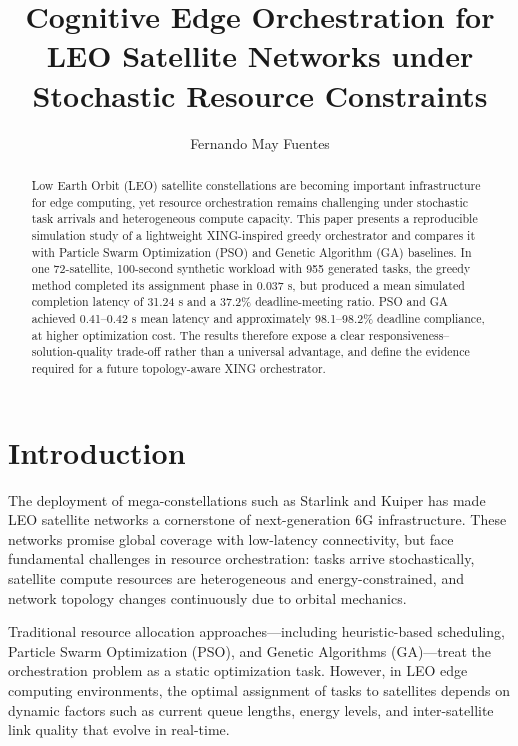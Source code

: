 \documentclass[sigconf]{acmart}
\title{Cognitive Edge Orchestration for LEO Satellite Networks under Stochastic Resource Constraints}
\author{Fernando May Fuentes}
\affiliation{
  \institution{Instituto Polit\'{e}cnico Nacional}
  \city{Ciudad de M\'{e}xico}
  \country{M\'{e}xico}
}
\begin{document}
\begin{abstract}
Low Earth Orbit (LEO) satellite constellations are becoming important infrastructure for edge computing, yet resource orchestration remains challenging under stochastic task arrivals and heterogeneous compute capacity. This paper presents a reproducible simulation study of a lightweight XING-inspired greedy orchestrator and compares it with Particle Swarm Optimization (PSO) and Genetic Algorithm (GA) baselines. In one 72-satellite, 100-second synthetic workload with 955 generated tasks, the greedy method completed its assignment phase in 0.037 s, but produced a mean simulated completion latency of 31.24 s and a 37.2\% deadline-meeting ratio. PSO and GA achieved 0.41--0.42 s mean latency and approximately 98.1--98.2\% deadline compliance, at higher optimization cost. The results therefore expose a clear responsiveness--solution-quality trade-off rather than a universal advantage, and define the evidence required for a future topology-aware XING orchestrator.
\end{abstract}


\maketitle

\section{Introduction}

The deployment of mega-constellations such as Starlink and Kuiper has made LEO satellite networks a cornerstone of next-generation 6G infrastructure. These networks promise global coverage with low-latency connectivity, but face fundamental challenges in resource orchestration: tasks arrive stochastically, satellite compute resources are heterogeneous and energy-constrained, and network topology changes continuously due to orbital mechanics.

Traditional resource allocation approaches—including heuristic-based scheduling, Particle Swarm Optimization (PSO), and Genetic Algorithms (GA)—treat the orchestration problem as a static optimization task. However, in LEO edge computing environments, the optimal assignment of tasks to satellites depends on dynamic factors such as current queue lengths, energy levels, and inter-satellite link quality that evolve in real-time.
\end{document}
